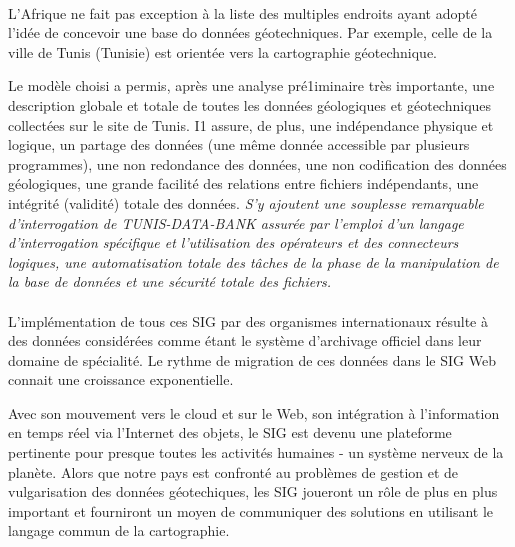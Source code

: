 
\paragraph{}
L'Afrique ne fait pas exception à la liste des multiples endroits ayant adopté l'idée
de concevoir une base do données géotechniques.
Par exemple, celle de la ville de Tunis (Tunisie) est orientée vers la cartographie géotechnique.
\par
Le modèle choisi a permis, après une analyse
pré1iminaire très importante, une description globale et
totale de toutes les données géologiques et géotechniques collectées sur le site de Tunis. I1
assure, de plus, une indépendance physique et logique, un partage des données (une même donnée accessible  
par plusieurs programmes), une non redondance des données, une non codification des
données géologiques, une grande facilité des relations
entre fichiers indépendants, une intégrité (validité)
totale des données. 
\textit{S'y ajoutent une souplesse remarquable d'interrogation de TUNIS-DATA-BANK
assurée par l'emploi d'un langage d'interrogation spécifique et l'utilisation des opérateurs et des connecteurs
logiques, une automatisation totale des tâches de la
phase de la manipulation de la base de données et une
sécurité totale des fichiers.}
\cite{tunis}


\paragraph{}
L’implémentation de tous ces SIG par des organismes internationaux résulte à des données considérées 
comme étant le système d’archivage officiel dans leur domaine de spécialité.
Le rythme de migration de ces données dans le SIG Web connait une croissance exponentielle. 
\par
Avec son mouvement vers le cloud et sur le Web, son intégration à l'information 
en temps réel via l'Internet des objets, le SIG est devenu une plateforme 
pertinente pour presque toutes les activités humaines - un système nerveux de 
la planète. Alors que notre pays est confronté au problèmes de gestion et de vulgarisation 
des données géotechiques, les SIG joueront un rôle de plus 
en plus important et 
fourniront un moyen de communiquer des solutions en utilisant le langage commun de 
la cartographie.